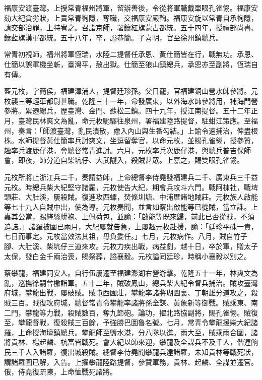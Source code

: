 \begin{pinyinscope}
福康安渡臺灣。上授常青福州將軍，留辦善後，令從將軍職戴單眼孔雀翎。福康安劾大紀貪劣狀，上責常青徇隱，奪職，交福康安嚴鞫。福康安旋以常青自承徇隱，請交部治罪，上特宥之。召詣京師，署鑲紅旗蒙古都統。五十四年，授禮部尚書、鑲藍旗漢軍都統。五十八年，卒，謚恭簡。子喜明，官至徐州鎮總兵。

常青初視師，福州將軍恆瑞，水陸二提督任承恩、黃仕簡皆在行，戰無功。承恩、仕簡以誤軍機坐斬，臺灣平，赦出獄。仕簡至狼山鎮總兵，承恩亦至副將，恆瑞自有傳。

藍元枚，字簡侯，福建漳浦人，提督廷珍孫。父日寵，官福建銅山營水師參將。元枚襲三等輕車都尉世職。乾隆三十一年，命發廣東，以外海水師參將用，補海門營參將。累遷總兵，歷臺灣、金門、蘇松三鎮。四十九年，授江南提督。五十二年正月，臺灣民林爽文為亂，命元枚馳驛往泉州，署福建陸路提督，駐蚶江策應。至福州，奏言：「師渡臺灣，亂民潰散，慮入內山與生番勾結。」上諭令速捕治，俾盡根株。水師提督黃仕簡率兵討爽文，坐逗留奪官，以命元枚，並賜孔雀翎，授參贊，趣率兵渡鹿仔港，會總督常青進討。六月，元枚率兵次鹿仔港，與總兵普吉保師會，即夜，師分道自柴坑仔、大武隴入，殺賊甚眾。上嘉之，賜雙眼孔雀翎。

元枚所將止浙江兵二千，奏請益師，上命總督李侍堯發福建兵二千、廣東兵三千益元枚。時總兵柴大紀堅守諸羅，元枚使告大紀，期會兵攻斗六門。戰阿棟社，戰埤頭莊、大肚溪，屢殺賊。復進攻西螺，焚條圳塘、中浦厝諸地賊莊。元枚族人啟能等七十九人自賊中出，使為導。元枚奏聞，並言如察出啟能等已從賊，當立誅。上嘉其公當，賜緙絲蟒袍、上佩荷包，並諭：「啟能等既來歸，前此已否從賊，不須追詰。」諸羅被圍已兩月，大紀屢就告急，上屢趣元枚赴援，諭：「廷珍平硃一貴，七日而事定。元枚當效法其祖，毋負委任。」七月，元枚病作。八月，賊自竹子腳、大肚溪、柴坑仔三道來攻。元枚力疾出戰，病益劇，越十日，卒於軍，贈太子太保，發白金千兩治喪，賜祭葬，謚襄毅。元枚謚同廷珍，時稱小襄毅以別之。

蔡攀龍，福建同安人。自行伍屢遷至福建澎湖右營游擊。乾隆五十一年，林爽文為亂，巡撫徐嗣曾檄詣軍。五十二年，賊破鳳山，總兵柴大紀令督兵捕治。賊攻臺灣府城，攀龍出戰，屢破賊。賊屯西園莊，攀龍率諸將瑚圖裏、丁朝雄分道攻之，殺賊三百。賊復攻府城，總督常青令攀龍率諸將孫全謀、黃象新等御戰。賊乘東、南二門，攀龍等力戰，殺賊數百，奪九節砲。論功，擢北路協副將，賜孔雀翎。賊復至，攀龍督戰，復殺賊三百餘，予強勝巴圖魯名號。七月，常青令攀龍援柴大紀諸羅，上命授海壇鎮總兵。攀龍師至鹽水港，分八隊以進。雨大至，賊乘雨合圍，諸將貴林、楊起麟、杭富皆戰死。會大紀以師來迎，攀龍及全謀兵不及千人，偕運餉民三千人入諸羅，復出城殺賊。總督李侍堯聞攀龍兵達諸羅，未知貴林等戰死狀，謂諸羅圍已解，入告。上擢攀龍陸路提督，參贊軍務，貴林、起麟、全謀並遷官。俄，侍堯復疏陳，上命恤戰死諸將。


\end{pinyinscope}
